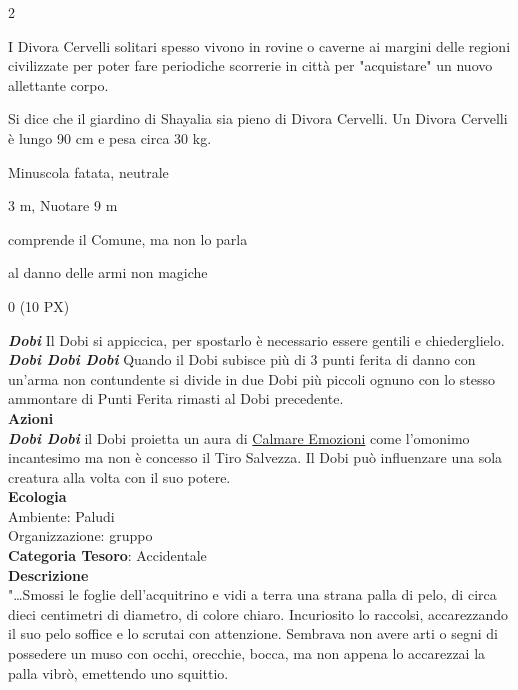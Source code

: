 \begin{multicols}{2}
{I Divora Cervelli solitari spesso vivono in rovine o caverne ai margini delle regioni civilizzate per poter fare periodiche scorrerie in città per "acquistare" un nuovo allettante corpo.

Si dice che il giardino di Shayalia sia pieno di Divora Cervelli. Un Divora Cervelli è lungo 90 cm e pesa circa 30 kg.

\begin{description}[noitemsep, topsep=0pt, parsep=0pt, partopsep=0pt, itemsep=1pt, leftmargin=2.35cm,  labelwidth=2.2cm, itemindent=0cm, listparindent=0pt] %
\setlength{\baselineskip}{10pt}
\item[\textbf{Taglia/Tipo}] Minuscola fatata, neutrale
\item[\textbf{Caratt.}] 
\item[\textbf{Punti Ferita}] 
\item[\textbf{Movimento}] 3 m, Nuotare 9 m
\item[\textbf{Tiri Salvez.}] 
\item[\textbf{Sensi}] 
\item[\textbf{Linguaggi}] comprende il Comune, ma non lo parla
\item[\textbf{Imm. Danni}] al danno delle armi non magiche
\item[\textbf{Sfida}] 0 (10 PX)
\end{description}
\smallskip

\emph{\textbf{Dobi}} Il Dobi si appiccica, per spostarlo è necessario essere gentili e chiederglielo.\\
\emph{\textbf{Dobi Dobi Dobi}} Quando il Dobi subisce più di 3 punti ferita di danno con un'arma non contundente si divide in due Dobi più piccoli ognuno con lo stesso ammontare di Punti Ferita rimasti al Dobi precedente.\\
\smallskip\textbf{Azioni}\\
\emph{\textbf{Dobi Dobi}} il Dobi proietta un aura di \hyperlink{Calmare Emozioni}{Calmare Emozioni} come l'omonimo incantesimo ma non è concesso il Tiro Salvezza. Il Dobi può influenzare una sola creatura alla volta con il suo potere.\\
\textbf{Ecologia}\\
Ambiente: Paludi\\
Organizzazione: gruppo\\
\textbf{Categoria Tesoro}: Accidentale\\
\textbf{Descrizione}\\
"…Smossi le foglie dell'acquitrino e vidi a terra una strana palla di pelo, di circa dieci centimetri di diametro, di colore chiaro. Incuriosito lo raccolsi, accarezzando il suo pelo soffice e lo scrutai con attenzione. Sembrava non avere arti o segni di possedere un muso con occhi, orecchie, bocca, ma non appena lo accarezzai la palla vibrò, emettendo uno squittio.

}
\end{multicols}

